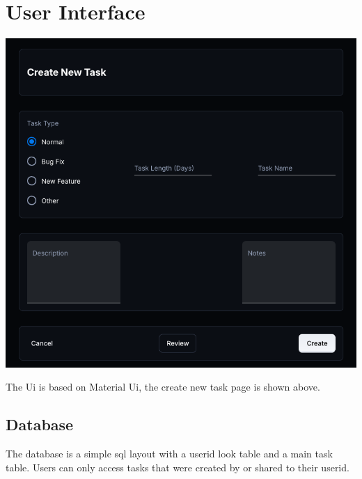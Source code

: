 \documentclass{article}
\begin{document}
 
\section{User Interface}

\includegraphics[width=0.9\linewidth]{../logo/mockup.png} 

The Ui is based on Material Ui\cite{mui}, the create new task page is shown above.

\subsection{Database}
The database is a simple \Gls{sql} layout with a userid look table and a main task table. Users can only access tasks that were created by or shared to their userid.


\pagebreak
\printglossaries

\printbibliography
\end{document}
